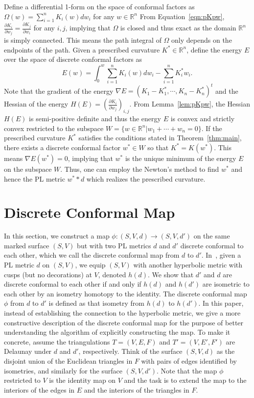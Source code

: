 \documentclass[11pt]{article}
\begin{document}
Define a differential 1-form on the space of conformal factors as 
$\Omega(w) = \sum_{i=1}^{n} K_i(w)dw_i$ for any $w \in \mathbb{R}^{n}$
From Equation~\eqref{eqn:pKpw}, $\frac{\partial K_i}{\partial w_j} = \frac{\partial K_j}{\partial w_i}$ for 
any $i, j$, implying that $\Omega$ is closed and thus exact as the domain  $\mathbb{R}^{n}$ is simply connected. 
This means the path integral of $\Omega$ only depends on the endpoints of the path. Given a prescribed curvature 
$K^* \in \mathbb{R}^{n}$, define the energy $E$ over the space of discrete conformal factors as 
\begin{equation}
E(w) = \int_0^w\sum_{i=1}^{n} K_i(w)dw_i - \sum_{i=1}^{n} K^*_iw_i.
\end{equation}
Note that the gradient of the energy $\nabla E = (K_1 - K^*_1, \cdots, K_{n}- K^*_{n})^t$ and 
the Hessian of the energy $H(E) = (\frac{\partial K_i}{\partial w_j})_{i, j}$. From Lemma~\ref{lem:pKpw}, the Hessian 
$H(E)$ is semi-positive definite and thus the energy $E$ is convex and strictly convex restricted to the subspace 
$W = \{w\in \mathbb{R}^{n} | w_1+\cdots+w_{n} = 0\}$. If the prescribed curvature $K^*$ satisfies the conditions
stated in Theorem~\ref{thm:main}, there exists a discrete conformal factor $w^*\in W$ so that $K^* = K(w^*)$. 
This means $\nabla E(w^*)=0$, implying that $w^*$ is the unique minimum of the energy $E$ on the subspace $W$.
Thus, one can employ the Newton's method to find $w^*$ and hence the PL metric $w^* *d$ which realizes the 
prescribed curvature. 

\section{Discrete Conformal Map}
\label{sec:disconf-map}
In this section, we construct a map $\phi: (S, V, d) \rightarrow (S, V, d')$ on the same marked 
surface $(S, V)$ but with two PL metrics $d$ and $d'$ discrete conformal to each other, which
we call the discrete conformal map from $d$ to $d'$. 
In~\cite{glsw2}, given a PL metric $d$ on $(S, V)$,  we equip $(S, V)$ with another hyperbolic metric 
with cusps (but no decorations) at $V$, denoted $h(d)$. We show that $d'$ and $d$ are discrete conformal 
to each other if and only if $h(d)$ and $h(d')$ are isometric to each other by an isometry homotopy to the identity. 
The discrete conformal map $\phi$ from $d$ to $d'$ is defined as that isometry from $h(d)$ to $h(d')$. 
In this paper, instead of establishing the connection to the hyperbolic metric, we give a more constructive 
description of the discrete conformal map for the purpose of better understanding the algorithm of 
explicitly constructing the map. To make it concrete, assume the triangulations
$T=(V, E, F)$ and $T'=(V, E', F')$ are Delaunay under $d$ and $d'$, respectively. Think of the 
surface $(S, V, d)$ as the disjoint union of the Euclidean triangles in $F$  with pairs of 
edges identified by isometries, and similarly for the surface $(S, V, d')$. 
Note that the map $\phi$ restricted to $V$ is the identity map on $V$ and the task is to extend 
the map to the interiors of the edges in $E$ and the interiors of the triangles in $F$. 
\end{document}
